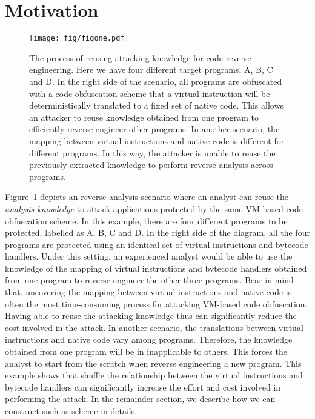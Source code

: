 \section{Motivation}
\begin{figure}[!t]
\centering
\texttt{[image: fig/figone.pdf]}
\caption{The process of reusing attacking knowledge for code reverse engineering.
Here we have four different target programs, A, B, C and D.
In the right side of the scenario, all programs are obfuscated with a code obfuscation scheme that a virtual instruction will be deterministically translated to a fixed set of native code.
This allows an attacker to reuse knowledge obtained from one program to efficiently reverse engineer other programs.
In another scenario, the mapping between virtual instructions and native code is different for different programs.
In this way, the attacker is  unable to reuse the previously extracted knowledge to perform reverse analysis across programs.}
\label{fig:one}
\end{figure}

Figure~\ref{fig:one} depicts an reverse analysis scenario where an analyst can
reuse the \textit{analysis knowledge} to attack applications protected by
the same VM-based code obfuscation scheme. In this example, there are four different programs
to be protected, labelled as A, B, C and D. In the right side of the diagram,
all the four programs are protected using an identical set of virtual
instructions and bytecode handlers. Under this setting, an experienced analyst would be able to
use the knowledge of the mapping of virtual instructions and bytecode handlers obtained
from one program to reverse-engineer the other three programs. Bear in mind that,
uncovering the mapping between virtual instructions and native code is often the most
time-consuming process for attacking VM-based code obfuscation. Having able to
reuse the attacking knowledge thus can significantly reduce the cost involved in the
attack.
In another scenario, the translations between virtual instructions and native code
vary among programs. Therefore,  the
knowledge obtained from one program will be in inapplicable to others.
This forces the analyst to start from the scratch when reverse engineering a new program.
This  example shows that shuffle the relationship between the virtual instructions and bytecode handlers
can significantly increase the effort and cost involved in performing the attack.
In the remainder section, we describe how we can construct such as scheme in details.  